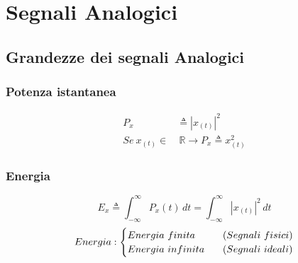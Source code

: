 \section{Segnali Analogici}
    \subsection{Grandezze dei segnali Analogici}
    
        \subsubsection{Potenza istantanea}\label{Potenza istantanea}
                \begin{align}
                    P_{x} & \triangleq |x_{(t)}|^2 \nonumber \\   
                    Se\ x_{(t)} \in &\ \mathbb{R} \rightarrow P_{x} \triangleq x_{(t)}^2 \nonumber
                \end{align}
        \subsubsection{Energia}
            \[
                E_{x} \triangleq \int_{-\infty}^{\infty} P_{x}(t) \,dt = \int_{-\infty}^{\infty} |x_{(t)}|^2 \,dt    
            \]
            \[
                Energia:
                \begin{cases}
                    Energia\ finita \hspace{0.3cm}& (Segnali\ fisici) \\
                    Energia\ infinita \hspace{0.3cm}& (Segnali\ ideali)
                \end{cases}  
            \]
